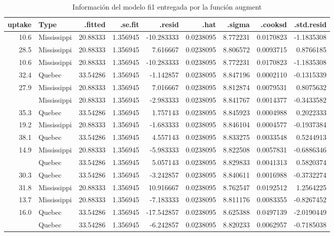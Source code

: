 \documentclass[]{book}
\begin{document}
\begin{table}

\caption{\label{tab:augment}Información del modelo fi1 entregada por la función augment}
\centering
\begin{tabular}[t]{rlrrrrrrr}
\toprule
uptake & Type & .fitted & .se.fit & .resid & .hat & .sigma & .cooksd & .std.resid\\
\midrule
10.6 & Mississippi & 20.88333 & 1.356945 & -10.283333 & 0.0238095 & 8.772231 & 0.0170823 & -1.1835308\\
28.5 & Mississippi & 20.88333 & 1.356945 & 7.616667 & 0.0238095 & 8.806572 & 0.0093715 & 0.8766185\\
10.6 & Mississippi & 20.88333 & 1.356945 & -10.283333 & 0.0238095 & 8.772231 & 0.0170823 & -1.1835308\\
32.4 & Quebec & 33.54286 & 1.356945 & -1.142857 & 0.0238095 & 8.847196 & 0.0002110 & -0.1315339\\
27.9 & Mississippi & 20.88333 & 1.356945 & 7.016667 & 0.0238095 & 8.812874 & 0.0079531 & 0.8075632\\
\addlinespace
17.9 & Mississippi & 20.88333 & 1.356945 & -2.983333 & 0.0238095 & 8.841767 & 0.0014377 & -0.3433582\\
35.3 & Quebec & 33.54286 & 1.356945 & 1.757143 & 0.0238095 & 8.845923 & 0.0004988 & 0.2022333\\
19.2 & Mississippi & 20.88333 & 1.356945 & -1.683333 & 0.0238095 & 8.846104 & 0.0004577 & -0.1937384\\
38.1 & Quebec & 33.54286 & 1.356945 & 4.557143 & 0.0238095 & 8.833275 & 0.0033548 & 0.5244913\\
14.9 & Mississippi & 20.88333 & 1.356945 & -5.983333 & 0.0238095 & 8.822508 & 0.0057831 & -0.6886346\\
\addlinespace
38.6 & Quebec & 33.54286 & 1.356945 & 5.057143 & 0.0238095 & 8.829833 & 0.0041313 & 0.5820374\\
30.3 & Quebec & 33.54286 & 1.356945 & -3.242857 & 0.0238095 & 8.840611 & 0.0016988 & -0.3732274\\
31.8 & Mississippi & 20.88333 & 1.356945 & 10.916667 & 0.0238095 & 8.762547 & 0.0192512 & 1.2564225\\
13.7 & Mississippi & 20.88333 & 1.356945 & -7.183333 & 0.0238095 & 8.811176 & 0.0083355 & -0.8267452\\
16.0 & Quebec & 33.54286 & 1.356945 & -17.542857 & 0.0238095 & 8.625388 & 0.0497139 & -2.0190449\\
\addlinespace
27.3 & Quebec & 33.54286 & 1.356945 & -6.242857 & 0.0238095 & 8.820233 & 0.0062957 & -0.7185038\\

\end{tabular}
\end{table}
\end{document}
